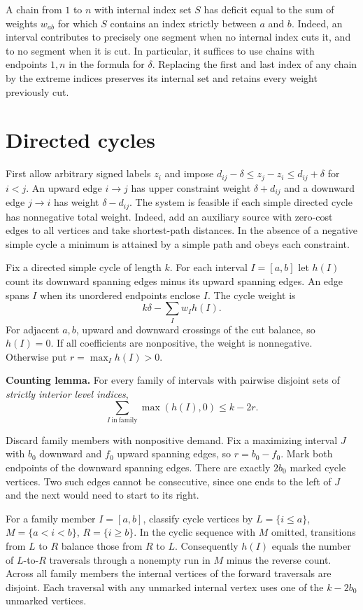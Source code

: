 \documentclass[11pt]{article}
\begin{document}
A chain from $1$ to $n$ with internal index set $S$ has deficit equal to the sum of weights $w_{ab}$ for which $S$ contains an index strictly between $a$ and $b$. Indeed, an interval contributes to precisely one segment when no internal index cuts it, and to no segment when it is cut. In particular, it suffices to use chains with endpoints $1,n$ in the formula for $\delta$. Replacing the first and last index of any chain by the extreme indices preserves its internal set and retains every weight previously cut.

\section{Directed cycles}

First allow arbitrary signed labels $z_i$ and impose $d_{ij}-\delta\le z_j-z_i\le d_{ij}+\delta$ for $i<j$. An upward edge $i\to j$ has upper constraint weight $\delta+d_{ij}$ and a downward edge $j\to i$ has weight $\delta-d_{ij}$. The system is feasible if each simple directed cycle has nonnegative total weight. Indeed, add an auxiliary source with zero-cost edges to all vertices and take shortest-path distances. In the absence of a negative simple cycle a minimum is attained by a simple path and obeys each constraint.

Fix a directed simple cycle of length $k$. For each interval $I=[a,b]$ let $h(I)$ count its downward spanning edges minus its upward spanning edges. An edge spans $I$ when its unordered endpoints enclose $I$. The cycle weight is
\[
 k\delta-\sum_I w_I h(I).
\]
For adjacent $a,b$, upward and downward crossings of the cut balance, so $h(I)=0$. If all coefficients are nonpositive, the weight is nonnegative. Otherwise put $r=\max_I h(I)>0$.

\textbf{Counting lemma.} For every family of intervals with pairwise disjoint sets of \emph{strictly interior level indices},
\[
 \sum_{I\ \mathrm{in\ family}}\max(h(I),0)\le k-2r.
\]

Discard family members with nonpositive demand. Fix a maximizing interval $J$ with $b_0$ downward and $f_0$ upward spanning edges, so $r=b_0-f_0$. Mark both endpoints of the downward spanning edges. There are exactly $2b_0$ marked cycle vertices. Two such edges cannot be consecutive, since one ends to the left of $J$ and the next would need to start to its right.

For a family member $I=[a,b]$, classify cycle vertices by $L=\{i\le a\}$, $M=\{a<i<b\}$, $R=\{i\ge b\}$. In the cyclic sequence with $M$ omitted, transitions from $L$ to $R$ balance those from $R$ to $L$. Consequently $h(I)$ equals the number of $L$-to-$R$ traversals through a nonempty run in $M$ minus the reverse count. Across all family members the internal vertices of the forward traversals are disjoint. Each traversal with any unmarked internal vertex uses one of the $k-2b_0$ unmarked vertices.
\end{document}
